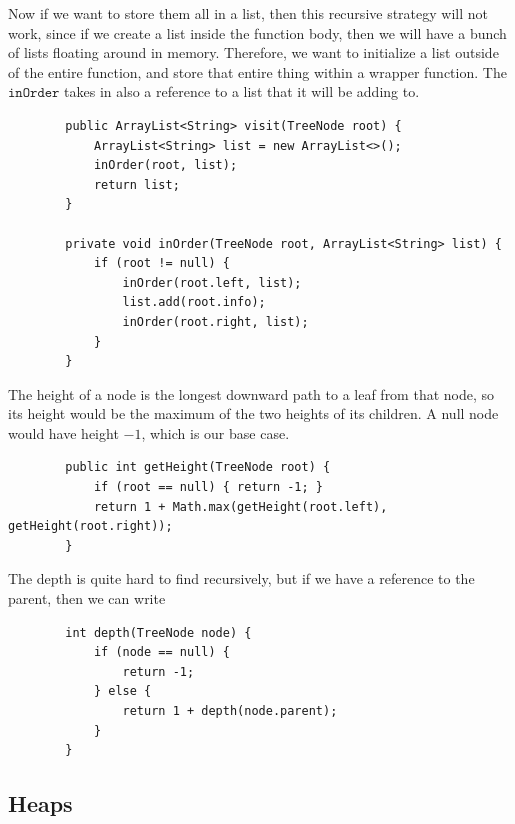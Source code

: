 \documentclass{article}
\begin{document}
    \begin{theorem}
      Now if we want to store them all in a list, then this recursive strategy will not work, since if we create a list inside the function body, then we will have a bunch of lists floating around in memory. Therefore, we want to initialize a list outside of the entire function, and store that entire thing within a wrapper function. The $\texttt{inOrder}$ takes in also a reference to a list that it will be adding to. 
      \begin{lstlisting}
        public ArrayList<String> visit(TreeNode root) {
            ArrayList<String> list = new ArrayList<>(); 
            inOrder(root, list); 
            return list; 
        }

        private void inOrder(TreeNode root, ArrayList<String> list) {
            if (root != null) {
                inOrder(root.left, list); 
                list.add(root.info); 
                inOrder(root.right, list); 
            }
        }
      \end{lstlisting}
    \end{theorem}

    \begin{definition}
      The height of a node is the longest downward path to a leaf from that node, so its height would be the maximum of the two heights of its children. A null node would have height $-1$, which is our base case. 
      \begin{lstlisting}
        public int getHeight(TreeNode root) {
            if (root == null) { return -1; }
            return 1 + Math.max(getHeight(root.left), getHeight(root.right)); 
        }
      \end{lstlisting}
    \end{definition}

    \begin{definition}
      The depth is quite hard to find recursively, but if we have a reference to the parent, then we can write 
      \begin{lstlisting}
        int depth(TreeNode node) {
            if (node == null) {
                return -1;
            } else {
                return 1 + depth(node.parent);
            }
        }
      \end{lstlisting}
    \end{definition}

  \subsection{Heaps}
\end{document}
